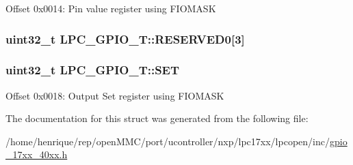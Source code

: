 Offset 0x0014\-: Pin value register using F\-I\-O\-M\-A\-S\-K \hypertarget{structLPC__GPIO__T_a292d7fd1269aebf1bf53d6df324319a3}{
\subsubsection[{R\-E\-S\-E\-R\-V\-E\-D0}]{\setlength{\rightskip}{0pt plus 5cm}uint32\-\_\-t L\-P\-C\-\_\-\-G\-P\-I\-O\-\_\-\-T\-::\-R\-E\-S\-E\-R\-V\-E\-D0\mbox{[}3\mbox{]}}}\label{structLPC__GPIO__T_a292d7fd1269aebf1bf53d6df324319a3}
\hypertarget{structLPC__GPIO__T_aaafd15e2c4eb4665f7a546dfeea25954}{
\subsubsection[{S\-E\-T}]{ uint32\-\_\-t L\-P\-C\-\_\-\-G\-P\-I\-O\-\_\-\-T\-::\-S\-E\-T}}\label{structLPC__GPIO__T_aaafd15e2c4eb4665f7a546dfeea25954}
Offset 0x0018\-: Output Set register using F\-I\-O\-M\-A\-S\-K 

The documentation for this struct was generated from the following file\-:\begin{DoxyCompactItemize}
\item 
/home/henrique/rep/open\-M\-M\-C/port/ucontroller/nxp/lpc17xx/lpcopen/inc/\hyperlink{gpio__17xx__40xx_8h}{gpio\-\_\-17xx\-\_\-40xx.\-h}\end{DoxyCompactItemize}
